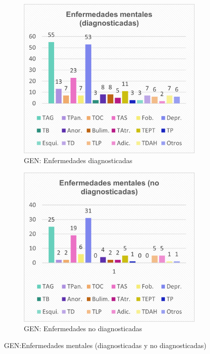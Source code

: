 \documentclass[12pt, a4paper,twoside,titlepage]{book}
\begin{document}
\begin{figure}
\centering
\begin{subfigure}{.5\textwidth}
  \centering
  \includegraphics[width=.95\linewidth]{Imagenes Form GEN/Enfdiag}
  \caption{GEN: Enfermedades diagnosticadas}
\end{subfigure}%
\begin{subfigure}{.5\textwidth}
  \centering
  \includegraphics[width=.95\linewidth]{Imagenes Form GEN/Enfnodiag}
  \caption{GEN: Enfermedades no diagnosticadas}
\end{subfigure}
\caption{GEN:Enfermedades mentales (diagnosticadas y no diagnosticadas)}
\label{fig:Diagnodiag}
\end{figure}
\end{document}
